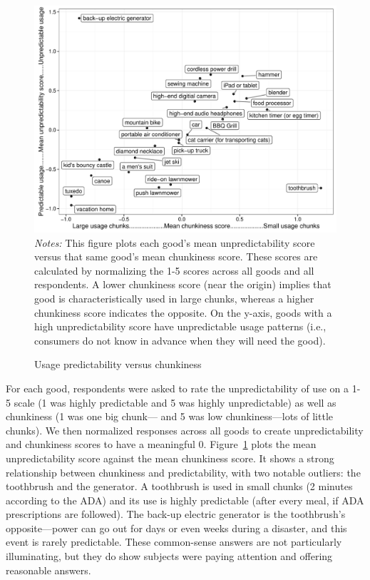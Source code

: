 \documentclass[12pt]{article}
\begin{document}
\begin{figure}
\centering 
\caption{Usage predictability versus chunkiness \label{fig:granularity_v_predictability}}
\begin{minipage}{0.90 \linewidth}
  \includegraphics[width = \linewidth]{./plots/granularity_versus_predictability.pdf} \\
  {\footnotesize 
    \emph{Notes:} This figure plots each good's mean unpredictability score versus that same good's mean chunkiness score.
    These scores are calculated by normalizing the 1-5 scores across all goods and all respondents.
    A lower chunkiness score (near the origin) implies that good is characteristically used in large chunks, whereas a higher chunkiness score indicates the opposite.
    On the y-axis, goods with a high unpredictability score have unpredictable usage patterns (i.e., consumers do not know in advance when they will need the good). 
   }
\end{minipage} 
\end{figure} 

For each good, respondents were asked to rate the unpredictability of use on a 1-5 scale (1 was highly predictable and 5 was highly unpredictable) as well as chunkiness (1 was one big chunk--- and 5 was low chunkiness---lots of little chunks).
We then normalized responses across all goods to create unpredictability and chunkiness scores to have a meaningful 0. 
Figure~\ref{fig:granularity_v_predictability} plots the mean unpredictability score against the mean chunkiness score. 
It shows a strong relationship between chunkiness and predictability, with two notable outliers: the toothbrush and the generator. 
A toothbrush is used in small chunks (2 minutes according to the ADA) and its use is highly predictable (after every meal, if ADA prescriptions are followed).
The back-up electric generator is the toothbrush's opposite---power can go out for days or even weeks during a disaster, and this event is rarely predictable. 
These common-sense answers are not particularly illuminating, but they do show subjects were paying attention and offering reasonable answers. 
\end{document}
